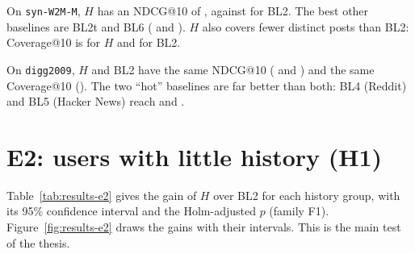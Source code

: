 On \texttt{syn-W2M-M}, $H$ has an NDCG@10 of \eOneWTwoMNdcgHTenAllValue{}, against \eOneWTwoMNdcgBLTwoTenAllValue{} for BL2. The best other baselines are BL2t and BL6 (\eOneWTwoMNdcgBLTwoTTenAllValue{} and \eOneWTwoMNdcgBLSixTenAllValue{}). $H$ also covers fewer distinct posts than BL2: Coverage@10 is \eOneWTwoMCovHTenAllValue{} for $H$ and \eOneWTwoMCovBLTwoTenAllValue{} for BL2.

On \texttt{digg2009}, $H$ and BL2 have the same NDCG@10 (\eOneDiggNdcgHTenAllValue{} and \eOneDiggNdcgBLTwoTenAllValue{}) and the same Coverage@10 (\eOneDiggCovHTenAllValue{}). The two ``hot'' baselines are far better than both: BL4 (Reddit) and BL5 (Hacker News) reach \eOneDiggNdcgBLFourTenAllValue{} and \eOneDiggNdcgBLFiveTenAllValue{}.

\section{E2: users with little history (H1)}
\label{sec:results-e2}

Table~\ref{tab:results-e2} gives the gain of $H$ over BL2 for each history group, with its 95\% confidence interval and the Holm-adjusted $p$ (family F1). Figure~\ref{fig:results-e2} draws the gains with their intervals. This is the main test of the thesis.

\begin{table}[htbp]
  \centering
  \caption{E2: gain of $H$ over BL2 by history group, NDCG@10 (family F1, Holm-adjusted $p$).}
  \label{tab:results-e2}
  \small
  \resizebox{\textwidth}{!}{}
\end{table}

